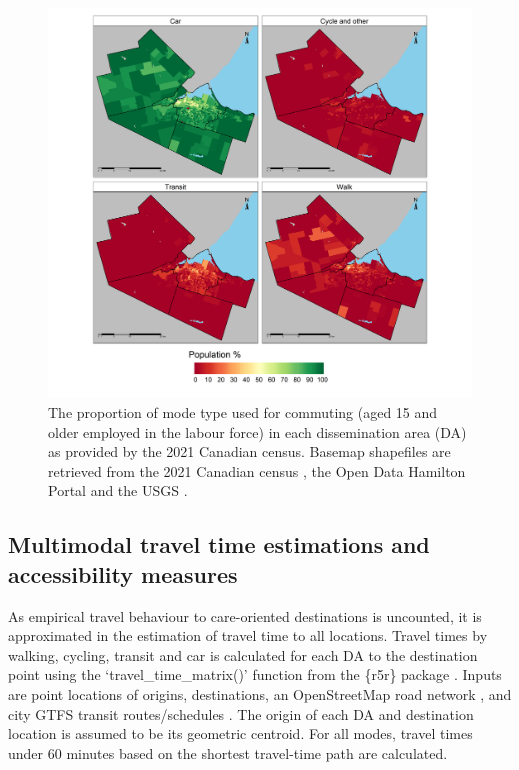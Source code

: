 \documentclass[
  authoryear,
  preprint,
  3p]{elsarticle}
\begin{document}
\begin{figure}

{\centering \includegraphics[width=6.25in,height=\textheight]{figures/Fig4-plot_modal_splits.png}

}

\caption{\label{fig-Fig4}The proportion of mode type used for commuting
(aged 15 and older employed in the labour force) in each dissemination
area (DA) as provided by the 2021 Canadian census. Basemap shapefiles
are retrieved from the 2021 Canadian census
\citep{governmentofcanadaCensusPopulation2023}, the Open Data Hamilton
Portal \citep{opendatahamiltonCityBoundary2023} and the USGS
\citep{greatlakesUSGS2010}.}

\end{figure}

\hypertarget{multimodal-travel-time-estimations-and-accessibility-measures}{%
\subsection{Multimodal travel time estimations and accessibility
measures}\label{multimodal-travel-time-estimations-and-accessibility-measures}}

As empirical travel behaviour to care-oriented destinations is
uncounted, it is approximated in the estimation of travel time to all
locations. Travel times by walking, cycling, transit and car is
calculated for each DA to the destination point using the
`travel\_time\_matrix()' function from the \{r5r\} package
\citep{pereiraR5rRapidRealistic2021}. Inputs are point locations of
origins, destinations, an OpenStreetMap road network
\citep{geofabrikOntarioCanadaOpen2023}, and city GTFS transit
routes/schedules \citep{transitfeedsHamiltonStreetRailway2023}. The
origin of each DA and destination location is assumed to be its
geometric centroid. For all modes, travel times under 60 minutes based
on the shortest travel-time path are calculated.
\end{document}
